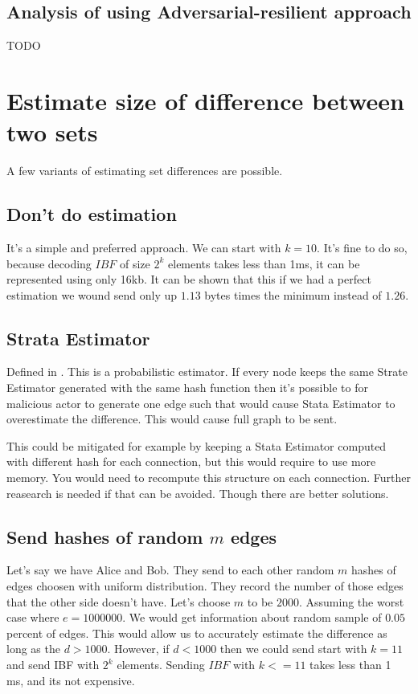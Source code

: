 \documentclass[11pt]{article}
\begin{document}
\subsection{Analysis of using Adversarial-resilient approach}
TODO

\section{Estimate size of difference between two sets}\label{sec:estimate}
A few variants of estimating set differences are possible.
\subsection{Don't do estimation}
It's a simple and preferred approach.
We can start with $k = 10$. It's fine to do so, because decoding $IBF$ of size $2^k$ elements takes less than 1ms, it can be represented using only 16kb.
It can be shown that this if we had a perfect estimation we wound send only up $1.13$ bytes times the minimum instead of $1.26$.

\subsection{Strata Estimator}
Defined in \cite{esrwpc}.
This is a probabilistic estimator. If every node keeps the same Strate Estimator generated with the same hash function then it's possible to for malicious actor to generate one edge such that would cause Stata Estimator to overestimate the difference. This would cause full graph to be sent.

This could be mitigated for example by keeping a Stata Estimator computed with different hash for each connection, but this would require to use more memory.
You would need to recompute this structure on each connection.
Further reasearch is needed if that can be avoided. Though there are better solutions.
\subsection{Send hashes of random $m$ edges}
Let's say we have Alice and Bob.
They send to each other random $m$ hashes  of edges choosen with uniform distribution.
They record the number of those edges that the other side doesn't have.
Let's choose $m$ to be $2000$.
Assuming the worst case where $e = 1000000$. We would get information about random sample of $0.05$ percent of edges.
This would allow us to accurately estimate the difference as long as the $d > 1000$.
However, if $d < 1000$ then we could send start with $k = 11$ and send IBF with $2^k$ elements.
Sending $IBF$ with $k <= 11$ takes less than 1 ms, and its not expensive.
\end{document}
